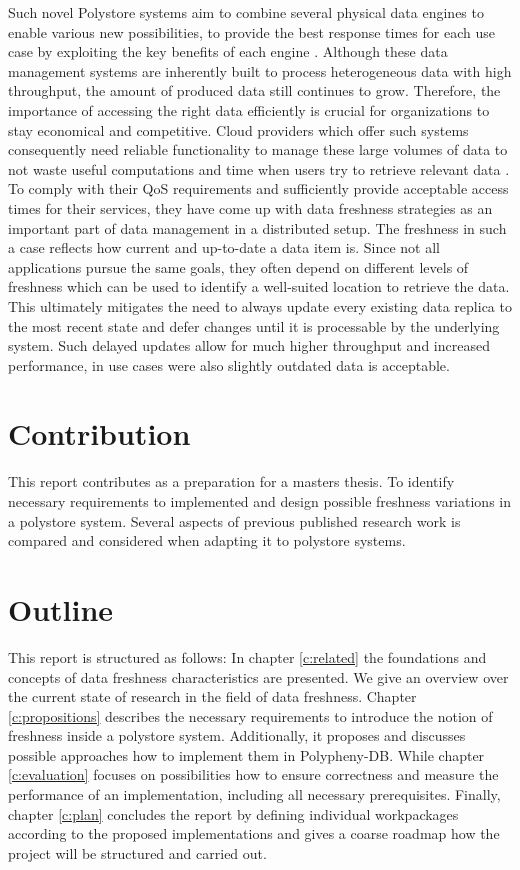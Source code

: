 Such novel Polystore systems aim to combine several physical data engines to enable various
new possibilities, to provide the best response times for each use case by exploiting
the key benefits of each engine \cite{stonebraker:2005}. Although these data management systems are inherently
built to process heterogeneous data with high throughput, the amount of produced data
still continues to grow.
Therefore, the importance of accessing the right data efficiently is crucial
for organizations to stay economical and competitive. Cloud providers which offer such systems consequently 
need reliable functionality to manage these large volumes of data to not waste useful computations and time when users
try to retrieve relevant data \cite{levandowski2013}.
To comply with their QoS requirements and sufficiently provide acceptable access times for their services, 
they have come up with data freshness strategies as an important part of data management in a
distributed setup. 
The freshness in such a case reflects how current and up-to-date a data item is.
Since not all applications pursue the same goals, they often depend on different levels of freshness which can be used to identify a well-suited location
to retrieve the data. This ultimately mitigates the need to always update every existing data replica to the most recent state and defer changes until
it is processable by the underlying system.
Such delayed updates allow for much higher throughput and increased performance, in use cases were also slightly outdated data 
is acceptable.


\section{Contribution}
This report contributes as a preparation for a masters thesis. To identify necessary requirements to implemented and design possible 
freshness variations in a polystore system. Several aspects of previous published research work is compared and considered when adapting it to polystore systems.

\section{Outline}
This report is structured as follows:
In chapter \ref{c:related} the foundations and concepts of data freshness characteristics are presented.
We give an overview over the current state of research in the field of data freshness.
Chapter \ref{c:propositions} describes the necessary requirements to introduce the notion of freshness inside a polystore system. Additionally, it proposes and discusses
possible approaches how to implement them in Polypheny-DB.
While chapter \ref{c:evaluation} focuses on possibilities how to ensure correctness and measure the performance of an implementation, including all necessary prerequisites.
Finally, chapter \ref{c:plan} concludes the report by defining individual workpackages according to the proposed
implementations and gives a coarse roadmap how the project will be structured and carried out.


